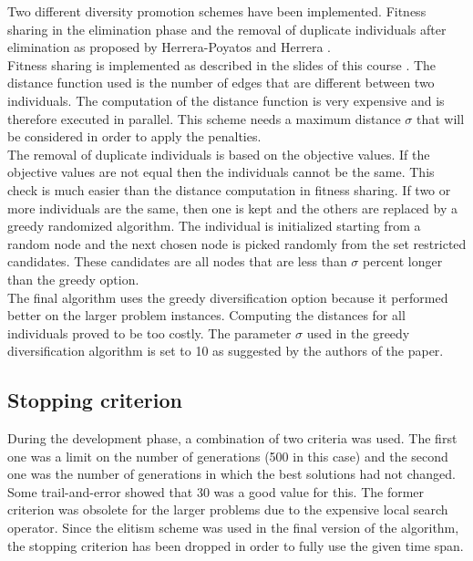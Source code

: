 \documentclass[a4paper,10pt]{article}
\newcommand{\ReplaceMe}[1]{{\color{blue}#1}}
\begin{document}
Two different diversity promotion schemes have been implemented. Fitness sharing in the elimination phase and the removal of duplicate individuals after elimination as proposed by Herrera-Poyatos and Herrera \cite{herrera}.\\
Fitness sharing is implemented as described in the slides of this course \cite{slides}. The distance function used is the number of edges that are different between two individuals. The computation of the distance function is very expensive and is therefore executed in parallel. This scheme needs a maximum distance $\sigma$ that will be considered in order to apply the penalties.\\
The removal of duplicate individuals is based on the objective values. If the objective values are not equal then the individuals cannot be the same. This check is much easier than the distance computation in fitness sharing. If two or more individuals are the same, then one is kept and the others are replaced by a greedy randomized algorithm. The individual is initialized starting from a random node and the next chosen node is picked randomly from the set restricted candidates. These candidates are all nodes that are less than $\sigma$ percent longer than the greedy option.\\
The final algorithm uses the greedy diversification option because it performed better on the larger problem instances. Computing the distances for all individuals proved to be too costly. The parameter $\sigma$ used in the greedy diversification algorithm is set to 10 as suggested by the authors of the paper.

\subsection{Stopping criterion}


During the development phase, a combination of two criteria was used. The first one was a limit on the number of generations (500 in this case) and the second one was the number of generations in which the best solutions had not changed. Some trail-and-error showed that 30 was a good value for this. The former criterion was obsolete for the larger problems due to the expensive local search operator. Since the elitism scheme was used in the final version of the algorithm, the stopping criterion has been dropped in order to fully use the given time span.
\end{document}
